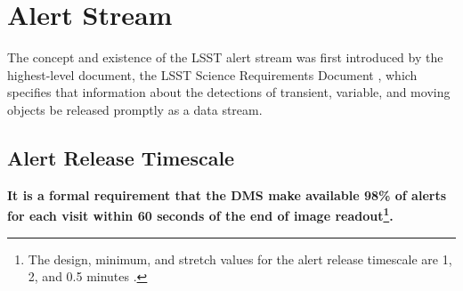 \documentclass[DM,lsstdraft,authoryear,toc]{lsstdoc}
\begin{document}


\section{Alert Stream} \label{sec:alerts}

The concept and existence of the LSST alert stream was first introduced by the highest-level document, the LSST Science Requirements Document , which specifies that information about the detections of transient, variable, and moving objects be released promptly as a data stream. 

	
\subsection{Alert Release Timescale}\label{ssec:OTT1}

{\bf It is a formal requirement that the DMS make available 98\% of alerts for each visit within 60 seconds of the end of image readout\footnote{The design, minimum, and stretch values for the alert release timescale are 1, 2, and 0.5 minutes .}.}
\end{document}
